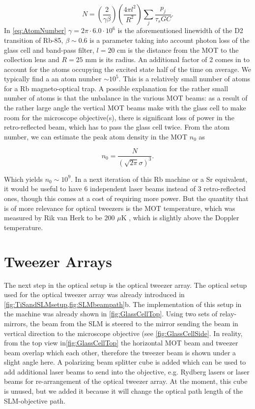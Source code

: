  \begin{equation}\label{eq:AtomNumber}
     N = \left( \frac{2}{\gamma\beta}\right)
     \left(\frac{4\pi l^2}{R^2}\right)
     \sum_j \frac{p_j}{\tau_s G C}.
 \end{equation}
In \cref{eq:AtomNumber} $\gamma = 2\pi \cdot 6.0 \cdot 10^6$ is the aforementioned linewidth of the D2 transition of Rb-85, $\beta \sim 0.6$ is a parameter taking into account photon loss of the glass cell and band-pass filter, $l = 20$ cm is the distance from the MOT to the collection lens and $R = 25$ mm is its radius. 
An additional factor of 2 comes in to account for the atoms occupying the excited state half of the time on average. 
We typically find a an atom number $\sim 10^5$.
This is a relatively small number of atoms for a Rb magneto-optical trap.
A possible explanation for the rather small number of atoms is that the unbalance in the various MOT beams: as a result of the rather large angle the vertical MOT beams make with the glass cell to make room for the microscope objective(s), there is significant loss of power in the retro-reflected beam, which has to pass the glass cell twice. 
From the atom number, we can estimate the peak atom density in the MOT $n_0$ as \cite{Townsend1995}

\begin{equation}
    n_0 = \frac{N}{(\sqrt{2\pi}\sigma)^3}.
\end{equation}

Which yields $n_0 \sim 10^9$.
In a next iteration of this Rb machine or a Sr equivalent, it would be useful to have 6 independent laser beams instead of 3 retro-reflected ones, though this comes at a cost of requiring more power. 
But the quantity that is of more relevance for optical tweezers is the MOT temperature, which was measured by Rik van Herk to be $200$ $\mu$K \cite{Herk2022}, which is slightly above the Doppler temperature. 
 

\section{Tweezer Arrays}\label{sec:Tweezers}

The next step in the optical setup is the optical tweezer array. 
The optical setup used for the optical tweezer array was already introduced in \cref{fig:TiSandSLMsetup,fig:SLMbeampath}b.
The implementation of this setup in the machine was already shown in \cref{fig:GlassCellTop}.
Using two sets of relay-mirrors, the beam from the \ac{SLM} is steered to the mirror sending the beam in vertical direction to the microscope objective (see \cref{fig:GlassCellSide}. 
In reality, from the top view in\cref{fig:GlassCellTop} the horizontal MOT beam and tweezer beam overlap which each other, therefore the tweezer beam is shown under a slight angle here.
A polarizing beam splitter cube is added which can be used to add additional laser beams to send into the objective, e.g. Rydberg lasers or laser beams for re-arrangement of the optical tweezer array. 
At the moment, this cube is unused, but we added it because it will change the optical path length of the SLM-objective path.

